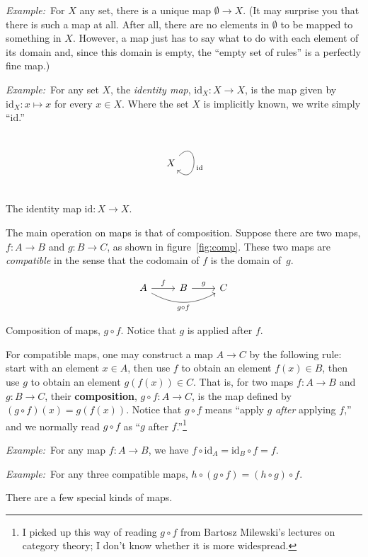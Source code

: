 \documentclass[12pt, a4paper]{article}
\newcommand{\defn}[1]{\textbf{#1}}
\newcommand{\eg}{\emph{Example:}\relax}
\newcommand{\id}{\text{id}}
\begin{document}
\eg\ For $X$ any set, there is a unique map $\emptyset \to X$. (It may surprise
you that there is such a map at all. After all, there are no elements
in $\emptyset$ to be mapped to something in $X$. However, a map just has to
say what to do with each element of its domain and, since this domain
is empty, the “empty set of rules” is a perfectly fine map.)

\eg\ For any set $X$, the \emph{identity map}, $\id_X\colon X \to X$, is
the map given by $\id_X\colon x \mapsto x$ for every $x\in X$. Where the set
$X$ is implicitly known, we write simply “$\id$.”
\begin{sidefigure}
\[\begin{tikzcd}
    X \arrow[loop right, out=45, in=-45, distance=3em, "\id"]
  \end{tikzcd}\]
  \caption{The identity map $\id\colon X\to X$.}
\end{sidefigure}

The main operation on maps is that of composition. Suppose there are
two maps, $f\colon A\to B$ and $g\colon B\to C$, as shown in
figure~\ref{fig:comp}. These two maps are \emph{compatible} in the
sense that the codomain of $f$ is the domain of~$g$.
\begin{sidefigure}
  \[
  \begin{tikzcd}
    A \arrow [rr, bend right, "g \circ f"' ] \arrow[r, "f"] & B \arrow[r, "g"] & C 
  \end{tikzcd}
  \]
  \caption{Composition of maps, $g \circ f$. Notice that $g$ is applied
    after $f$.\label{fig:comp}}
\end{sidefigure}
For compatible maps, one may construct a map $A\to C$ by the following
rule: start with an element $x\in A$, then use $f$ to obtain an element
$f(x)\in B$, then use $g$ to obtain an element $g(f(x))\in C$. That is,
for two maps $f\colon A \to B$ and $g\colon B \to C$, their
\defn{composition}, $g\circ f\colon A \to C$, is the map defined by $(g\circ
f)(x) = g(f(x))$. Notice that $g\circ f$ means “apply $g$ \emph{after}
applying $f$,” and we normally read $g\circ f$ as “$g$ after
$f$.”\footnote{I picked up this way of reading $g\circ f$ from Bartosz
  Milewski's lectures on category theory; I don't know whether it is
  more widespread.}
  
\eg\ For any map $f\colon A\to B$, we have $f\circ\id_A = \id_B\circ f = f$.

\eg\ For any three compatible maps, $h\circ (g\circ f) = (h\circ g)\circ f$.

There are a few special kinds of maps. 
\end{document}
